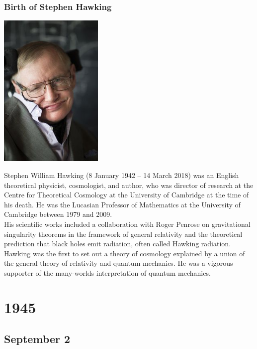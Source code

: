 \documentclass[11pt]{report}
\begin{document}
\subsection{Birth of Stephen Hawking}
\vspace{2mm}\begin{center}\includegraphics[width=5cm]{./img/stephenhawking.jpg}\end{center}
Stephen William Hawking (8 January 1942 – 14 March 2018) was an English theoretical physicist, cosmologist, and author, who was director of research at the Centre for Theoretical Cosmology at the University of Cambridge at the time of his death. He was the Lucasian Professor of Mathematics at the University of Cambridge between 1979 and 2009.\\
His scientific works included a collaboration with Roger Penrose on gravitational singularity theorems in the framework of general relativity and the theoretical prediction that black holes emit radiation, often called Hawking radiation. Hawking was the first to set out a theory of cosmology explained by a union of the general theory of relativity and quantum mechanics. He was a vigorous supporter of the many-worlds interpretation of quantum mechanics.

\chapter{1945}
\section{September 2}
\end{document}

